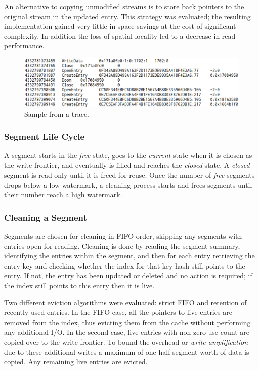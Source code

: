 \documentclass[letterpaper,twocolumn,10pt]{article}
\begin{document}
An alternative to copying unmodified streams is to store back pointers to the
original stream in the updated entry. This strategy was evaluated; the resulting
implementation gained very little in space savings at the cost of significant
complexity. In addition the loss of spatial locality led to a decrease in read
performance.

\begin{figure}
  \begin{center}
    \includegraphics[width=\columnwidth]{graphs/trace}
  \end{center}
  \caption{Sample from a trace.}
  \label{fig:trace}
\vspace{-0.2in}
\end{figure}

\subsubsection{Segment Life Cycle}
A segment starts in the \emph{free} state, goes to the \emph{current} state when
it is chosen as the write frontier, and eventually is filled and reaches the
\emph{closed} state.  A \emph{closed} segment is read-only until it is freed for
reuse.  Once the number of \emph{free} segments drops below a low watermark, a
cleaning process starts and frees segments until their number reach a high
watermark.

\subsubsection{Cleaning a Segment}
Segments are chosen for cleaning in FIFO order, skipping any segments with
entries open for reading. Cleaning is done by reading the segment summary,
identifying the entries within the segment, and then for each entry retrieving
the entry key and checking whether the index for that key hash still points to
the entry. If not, the entry has been updated or deleted and no action is
required; if the index still points to this entry then it is live.

Two different eviction algorithms were evaluated: strict FIFO and retention of
recently used entries.  In the FIFO case, all the pointers to live entries are
removed from the index, thus evicting them from the cache without performing any
additional I/O.  In the second case, live entries with non-zero use count are
copied over to the write frontier.  To bound the overhead or \emph{write
  amplification} due to these additional writes a maximum of one half segment
worth of data is copied.  Any remaining live entries are evicted.
\end{document}
